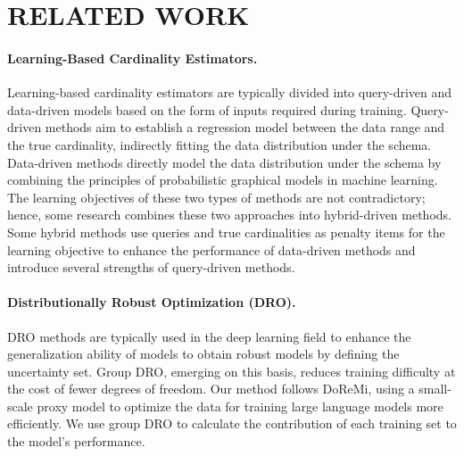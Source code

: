 \section{RELATED WORK}
\paragraph{Learning-Based Cardinality Estimators.}Learning-based cardinality estimators are typically divided into query-driven and data-driven models based on the form of inputs required during training. Query-driven methods\cite{kipf2018learned,dutt2019selectivity,zhao2022lightweight} aim to establish a regression model between the data range and the true cardinality, indirectly fitting the data distribution under the schema. Data-driven methods\cite{hilprecht2019deepdb,wang2021face,wu2012bayescard,wu2023factorjoin,yang2019deep,yang2020neurocard,} directly model the data distribution under the schema by combining the principles of probabilistic graphical models in machine learning. The learning objectives of these two types of methods are not contradictory; hence, some research combines these two approaches into hybrid-driven methods. Some hybrid methods \cite{dutt2019selectivity,wu2021unified} use queries and true cardinalities as penalty items for the learning objective to enhance the performance of data-driven methods and introduce several strengths of query-driven methods.

\paragraph{Distributionally Robust Optimization (DRO).}DRO methods are typically used in the deep learning field\cite{oren2019distributionally,sagawa2019distributionally,xie2024doremi} to enhance the generalization ability of models to obtain robust models by defining the uncertainty set. Group DRO\cite{sagawa2019distributionally}, emerging on this basis, reduces training difficulty at the cost of fewer degrees of freedom. Our method follows DoReMi\cite{xie2024doremi}, using a small-scale proxy model to optimize the data for training large language models more efficiently. We use group DRO to calculate the contribution of each training set to the model's performance.